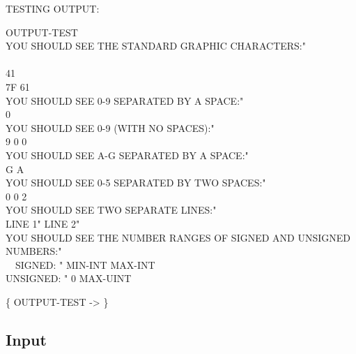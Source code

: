 \begin{tt}
TESTING OUTPUT:        

\word{:} OUTPUT-TEST \\[1ex]
\tab   {} YOU SHOULD SEE THE STANDARD GRAPHIC CHARACTERS:"  \\
       \\
 41      \\
\tab   7F 61      \\[1ex]
\tab   {} YOU SHOULD SEE 0-9 SEPARATED BY A SPACE:"  \\
  0      \\[1ex]
\tab   {} YOU SHOULD SEE 0-9 (WITH NO SPACES):"  \\
\tab   \word{[CHAR]} 9  \word{[CHAR]} 0
	  0     \\[1ex]
\tab   {} YOU SHOULD SEE A-G SEPARATED BY A SPACE:"  \\
\tab   \word{[CHAR]} G  \word{[CHAR]} A
	      \\[1ex]
\tab   {} YOU SHOULD SEE 0-5 SEPARATED BY TWO SPACES:"  \\
  0
	  \word{[CHAR]} 0 \word{+}  2    \\[1ex]
\tab   {} YOU SHOULD SEE TWO SEPARATE LINES:"  \\
\tab   {} LINE 1"    LINE 2"   \\[1ex]
\tab   {} {\small YOU SHOULD SEE THE NUMBER RANGES OF SIGNED AND UNSIGNED NUMBERS:}"  \\
\tab   {} ~~SIGNED: " MIN-INT  MAX-INT   \\
\tab   {} UNSIGNED: " 0  MAX-UINT   \\
\word{;}

\{ OUTPUT-TEST -> \}
\end{tt}

\subsection{Input}

